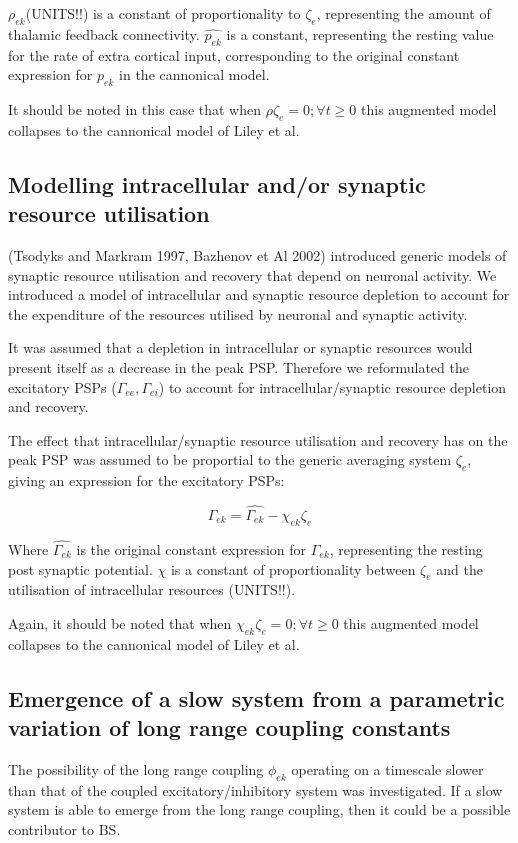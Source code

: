 \documentclass[a4paper,12pt]{article}
\begin{document}
$\rho_{ek}$(UNITS!!) is a constant of proportionality to $\zeta_e$, representing the amount of thalamic feedback connectivity. $\hat{p_{ek}}$ is a constant, representing
the resting value for the rate of extra cortical input, corresponding to the original constant expression for $p_{ek}$ in the cannonical model. 

It should be noted in this case that when $\rho\zeta_e=0; \forall t \geq 0$ this augmented model collapses to the cannonical model of Liley et al.

\subsection{Modelling intracellular and/or synaptic resource utilisation}
(Tsodyks and Markram 1997, Bazhenov et Al 2002) introduced generic models of synaptic resource utilisation and recovery that depend
on neuronal activity. We introduced a model of intracellular and synaptic resource depletion to account for the expenditure of the resources utilised by neuronal and synaptic activity. 

It was assumed that a depletion in intracellular or synaptic resources would present itself as a decrease in the peak PSP. Therefore we reformulated the excitatory PSPs ($\Gamma_{ee}, \Gamma_{ei}$) to
account for intracellular/synaptic resource depletion and recovery.

The effect that intracellular/synaptic resource utilisation and recovery has on the peak PSP was assumed to be proportial to the generic averaging system $\zeta_{e}$, giving an expression for
the excitatory PSPs:

\begin{equation} \label{eq:Gamma_ek}
\Gamma_{ek} = \hat{\Gamma_{ek}} - \chi_{ek} \zeta_e
\end{equation}

Where $\hat{\Gamma_{ek}}$ is the original constant expression for $\Gamma_{ek}$, representing the resting post synaptic potential. $\chi$ is a constant of proportionality between $\zeta_e$ and the utilisation of intracellular resources (UNITS!!).

Again, it should be noted that when $\chi_{ek} \zeta_e=0; \forall t \geq 0$ this augmented model collapses to the cannonical model of Liley et al.

\subsection{Emergence of a slow system from a parametric variation of long range coupling constants}
The possibility of the long range coupling $\phi_{ek}$ operating on a timescale slower than that of the coupled excitatory/inhibitory system was investigated. If a slow system is able to emerge from the long range coupling, then it could be a possible contributor to BS. 
\end{document}
